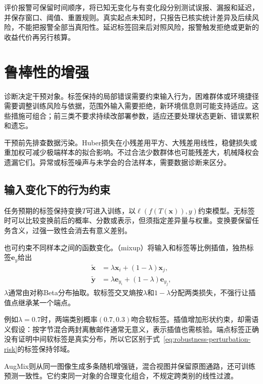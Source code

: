 评价报警可保留时间顺序，将已知无变化与有变化段分别测试误报、漏报和延迟，并保存窗口、阈值、重置规则。真实起点未知时，只报告已核实统计差异及后续风险，不能把报警全部当真阳性。延迟标签回来后对照风险，报警触发拒绝或更新的收益代价再另行核算。

\section{鲁棒性的增强}
\label{sec:robustness-enhancement}

诊断决定干预对象。标签保持的局部错误需要约束输入行为，困难群体或环境捷径需要调整训练风险与依据，范围外输入需要拒绝，新环境信息则可能支持适应。这些措施可组合；前三类不要求持续改部署参数，适应还要处理状态更新、错误累积和遗忘。

干预前先排查数据污染。Huber损失在小残差用平方、大残差用线性，稳健损失或重加权可减少极端样本的拟合影响。不过合法少数群体也可能残差大，机械降权会遗漏它们。异常或标签噪声与未学会的合法样本，需要数据诊断来区分。

\subsection{输入变化下的行为约束}
\label{sec:robustness-local-enhancement}

任务预期的标签保持变换$T$可进入训练，以$\ell(f(T(\bm{x})),y)$约束模型。无标签时可以比较变换前后的概率、分数或表示，但须指定差异量与权重。变换要保留任务含义，过强一致性会消去有意义差别。

也可约束不同样本之间的函数变化。（mixup）将输入和标签等比例插值，独热标签$\bm{e}_y$给出
\begin{equation}
 \begin{aligned}
  \widetilde{\bm{x}}&=\lambda\bm{x}_i+(1-\lambda)\bm{x}_j,\\
  \widetilde{\bm{y}}&=\lambda\bm{e}_{y_i}
                         +(1-\lambda)\bm{e}_{y_j},
 \end{aligned}
 \label{eq:robustness-mixup}
\end{equation}
$\lambda$通常由对称Beta分布抽取。软标签交叉熵按$\lambda$和$1-\lambda$分配两类损失，不强行让插值点继承某一个端点。

例如$\lambda=0.7$时，两端类别概率$(0.7,0.3)$吻合软标签。插值增加形状约束，却需语义假设：按字节混合两封离散邮件通常无意义，表示插值也需核验。端点标签正确没有证明中间软标签是真实分布，所以它区别于式~\eqref{eq:robustness-perturbation-risk}的标签保持邻域。

AugMix则从同一图像生成多条随机增强链，混合视图并保留原图通路，还可训练预测一致性。它约束同一对象的合理变化组合，不规定跨类别的线性过渡。

